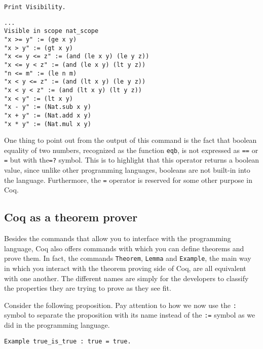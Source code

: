 \begin{verbatim}
Print Visibility.
\end{verbatim}
\vspace{-\baselineskip*5/4}
\begin{verbatim}
...
Visible in scope nat_scope
"x >= y" := (ge x y)
"x > y" := (gt x y)
"x <= y <= z" := (and (le x y) (le y z))
"x <= y < z" := (and (le x y) (lt y z))
"n <= m" := (le n m)
"x < y <= z" := (and (lt x y) (le y z))
"x < y < z" := (and (lt x y) (lt y z))
"x < y" := (lt x y)
"x - y" := (Nat.sub x y)
"x + y" := (Nat.add x y)
"x * y" := (Nat.mul x y)
\end{verbatim}

One thing to point out from the output of this command is the fact that boolean equality of two numbers,
recognized as the function \texttt{eqb}, is not expressed as \texttt{==} or 
\texttt{=} but with the\texttt{=?} symbol. This is to highlight that this operator returns a boolean
value, since unlike other programming languages, booleans are not built-in into the language. Furthermore,
the \texttt{=} operator is reserved for some other purpose in Coq.



\subsection{Coq as a theorem prover}
\label{sect:coq-proof-assistant}


Besides the commands that allow you to interface with the programming language, Coq also offers commands
with which you can define theorems and prove them. In fact, the commands \texttt{Theorem}, 
\texttt{Lemma} and \texttt{Example}, the main way in which you interact with the 
theorem proving side of Coq, are all equivalent with one another. The different names are simply for the 
developers to classify the properties they are trying to prove as they see fit.

Consider the following proposition. Pay attention to how we now use the \texttt{:} symbol to separate the 
proposition with its name instead of the \texttt{:=} symbol as we did in the programming language.

\begin{verbatim}
Example true_is_true : true = true.
\end{verbatim}

